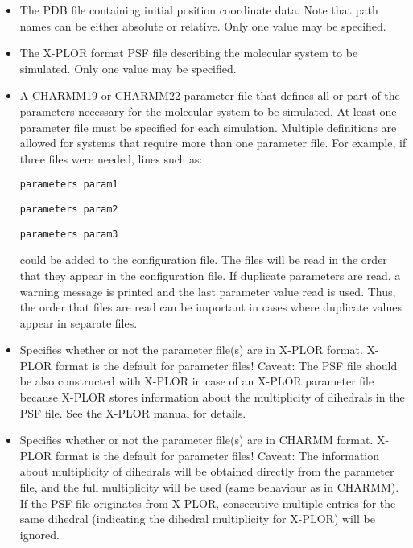 \begin{itemize}
\item
{}
{\label{param:coordinates}
The PDB file containing initial position coordinate data.  
Note that path names can be either absolute or relative.  
Only one value may be specified.}

\item
{}
{\label{param:structure}
The X-PLOR format PSF file describing the molecular 
system to be simulated.  
Only one value may be specified.}

\item
{}
{\label{param:parameters}
A CHARMM19 or CHARMM22 parameter file that defines all or part 
of the parameters necessary for the molecular system to be simulated.  
At least one parameter file must be specified for each simulation.  
Multiple definitions are allowed for systems that require more 
than one parameter file.  For example, if three files were needed, 
lines such as:

\bigskip

{\tt parameters param1}

{\tt parameters param2}

{\tt parameters param3}

\bigskip

\noindent could be added to the configuration file.  
The files will be read 
in the order that they appear in the configuration file.  If duplicate
parameters are read, a warning message is printed and the last
parameter value read is used.  Thus, the order that files are read 
can be important in cases where duplicate values appear in 
separate files.}

\item
{}
{Specifies whether or not the parameter file(s) are in X-PLOR format.
 X-PLOR format is the default for parameter files!
 Caveat: The PSF file should be also constructed with X-PLOR in
 case of an X-PLOR parameter file because X-PLOR stores information
 about the multiplicity of dihedrals in the PSF file. See the X-PLOR
 manual for details.}

\item
{}
{Specifies whether or not the parameter file(s) are in CHARMM format.
 X-PLOR format is the default for parameter files!
 Caveat: The information about multiplicity of dihedrals will be
 obtained directly from the parameter file, and the full multiplicity
 will be used (same behaviour as in CHARMM). If the PSF file originates
 from X-PLOR, consecutive multiple entries for the same dihedral 
 (indicating the dihedral multiplicity for X-PLOR) will be ignored.}


\end{itemize}
